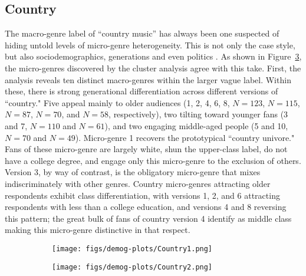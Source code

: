 \subsection{Country}
The macro-genre label of ``country music'' has always been one suspected of hiding untold levels of micro-genre heterogeneity. This is not only the case style, but also sociodemographics, generations and even politics \citep{rossman2004elites}. As shown in Figure~\ref{fig:Country}, the micro-genres discovered by the cluster analysis agree with this take. First, the analysis reveals ten distinct macro-genres within the larger vague label. Within these, there is strong generational differentiation across different versions of ``country." Five appeal mainly to older audiences (1, 2, 4, 6, 8, $N=123$, $N=115$, $N=87$, $N=70$, and $N=58$, respectively), two tilting toward younger fans (3 and 7, $N=110$ and $N=61$), and two engaging middle-aged people (5 and 10, $N=70$ and $N=49$). Micro-genre 1 recovers the prototypical ``country univore." Fans of these micro-genre are largely white, shun the upper-class label, do not have a college degree, and engage only this micro-genre to the exclusion of others. Version 3, by way of contrast, is the obligatory micro-genre that mixes indiscriminately with other genres. Country micro-genres attracting older respondents exhibit class differentiation, with versions 1, 2, and 6 attracting respondents with less than a college education, and versions 4 and 8 reversing this pattern; the great bulk of fans of country version 4 identify as middle class making this micro-genre distinctive in that respect. 

  \begin{figure}[ht!]
    \centering
     \begin{subfigure}[b]{0.8\textwidth}
        \texttt{[image: figs/demog-plots/Country1.png]}
        \caption{}
        \label{fig:Country1}
    \end{subfigure} 
     \begin{subfigure}[b]{0.8\textwidth}
        \texttt{[image: figs/demog-plots/Country2.png]}
        \caption{}
        \label{fig:Country2}
    \end{subfigure}
     \caption{}
  \label{fig:Country}
 \end{figure}